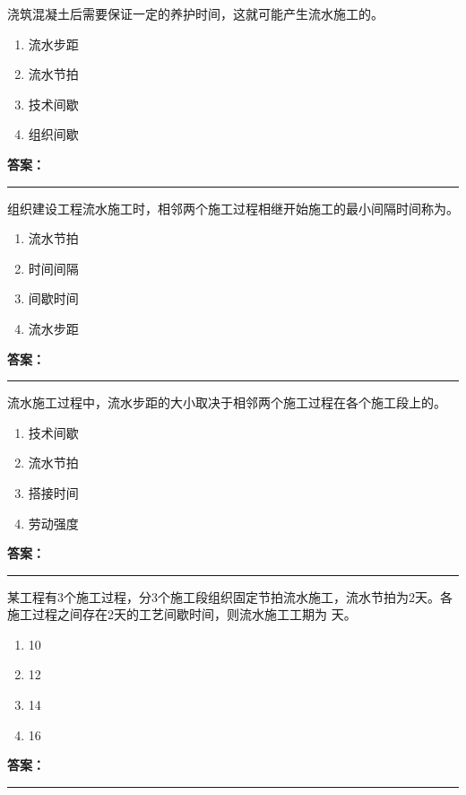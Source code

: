 \documentclass[UTF8,fontset=fandol,11pt]{ctexart}
\newcommand{\answerline}{\textcolor{answerred}{\rule{2.4cm}{0.7pt}}}
\begin{document}
\begin{quizbox}[title={第 7 题}]
浇筑混凝土后需要保证一定的养护时间，这就可能产生流水施工的。\\
\begin{enumerate}[label=\Alph*.]
\item 流水步距
\item 流水节拍
\item 技术间歇
\item 组织间歇
\end{enumerate}
\textbf{\textcolor{answerred}{答案：}} \answerline
\end{quizbox}

\begin{quizbox}[title={第 8 题}]
组织建设工程流水施工时，相邻两个施工过程相继开始施工的最小间隔时间称为。\\
\begin{enumerate}[label=\Alph*.]
\item 流水节拍
\item 时间间隔
\item 间歇时间
\item 流水步距
\end{enumerate}
\textbf{\textcolor{answerred}{答案：}} \answerline
\end{quizbox}

\begin{quizbox}[title={第 9 题}]
流水施工过程中，流水步距的大小取决于相邻两个施工过程在各个施工段上的。\\
\begin{enumerate}[label=\Alph*.]
\item 技术间歇
\item 流水节拍
\item 搭接时间
\item 劳动强度
\end{enumerate}
\textbf{\textcolor{answerred}{答案：}} \answerline
\end{quizbox}

\begin{quizbox}[title={第 10 题}]
某工程有3个施工过程，分3个施工段组织固定节拍流水施工，流水节拍为2天。各施工过程之间存在2天的工艺间歇时间，则流水施工工期为 天。\\
\begin{enumerate}[label=\Alph*.]
\item 10
\item 12
\item 14
\item 16
\end{enumerate}
\textbf{\textcolor{answerred}{答案：}} \answerline
\end{quizbox}
\end{document}

